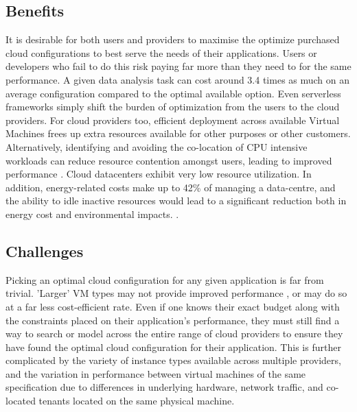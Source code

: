 \documentclass{report}
\begin{document}
\subsection{Benefits}
It is desirable for both users and providers to maximise the optimize purchased cloud configurations to best serve the needs of their applications. Users or developers who fail to do this risk paying far more than they need to for the same performance. A given data analysis task can cost around 3.4 times as much on an average configuration compared to the optimal available option\cite{Alipourfard2017}. Even serverless frameworks simply shift the burden of optimization from the users to the cloud providers. For cloud providers too, efficient deployment across available Virtual Machines frees up extra resources available for other purposes or other customers. Alternatively, identifying and avoiding the co-location of CPU intensive workloads can reduce resource contention amongst users, leading to improved performance \cite{Pu2010}. Cloud datacenters exhibit very low resource utilization\cite{Reiss2012}. In addition, energy-related costs make up to 42\% of managing a data-centre, and the ability to idle inactive resources would lead to a significant reduction both in energy cost and environmental impacts. \cite{Berl2010, Gkatzikis2013}. 

\subsection{Challenges}
Picking an optimal cloud configuration for any given application is far from trivial. 'Larger' VM types may not provide improved performance \cite{Yadwadkar2017}, or may do so at a far less cost-efficient rate. Even if one knows their exact budget along with the constraints placed on their application's performance, they must still find a way to search or model across the entire range of cloud providers to ensure they have found the optimal cloud configuration for their application. This is further complicated by the variety of instance types available across multiple providers, and the variation in performance between virtual machines of the same specification due to differences in underlying hardware, network traffic, and co-located tenants located on the same physical machine.
\end{document}
